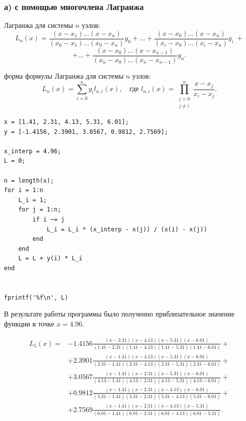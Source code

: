 \subsubsection*{а) с помощью многочлена Лагранжа}

 Лагранжа для системы $n$ узлов:
\[
L_n(x)=\frac{(x- x_1) \dots (x- x_n)}{(x_0 - x_1) \dots (x_0 - x_n)} y_0+ \dots + \frac{(x- x_0) \dots (x- x_n)}{(x_i - x_0) \dots (x_i - x_n)} y_i~+
\]
\[
+ \dots + \frac{(x- x_0) \dots (x- x_{n-1})}{(x_n - x_0) \dots (x_n - x_{n-1})} y_n.
\]

 форма формулы Лагранжа для системы $n$ узлов:
\[
L_n(x)= \sum_{i=0}^{n} y_i l_{n,i}(x), \quad \text{где } l_{n,i}(x)= \prod_{\substack{j=0 \\ j \neq i}}^{n} \frac{x- x_j}{x_i - x_j}.
\]

\begin{listing}[H]
\caption{Вычисление интерполяционного многочлена Лагранжа в точке 4.96}
\vspace{-20pt}
\label{lst:task1_lagrange}
\begin{verbatim}
x = [1.41, 2.31, 4.13, 5.31, 6.01];
y = [-1.4156, 2.3901, 3.0567, 0.9812, 2.7569];

x_interp = 4.96;
L = 0;

n = length(x);
for i = 1:n
    L_i = 1;
    for j = 1:n;
        if i ~= j
            L_i = L_i * (x_interp - x(j)) / (x(i) - x(j))
        end
    end
    L = L + y(i) * L_i
end


fprintf('%f\n', L)
\end{verbatim}
\end{listing}

В результате работы программы было полученно приблизательное значение функции в точке $x = 4.96$.

\[
\begin{aligned}
L_5(x)={}&
-1.4156\frac{(x-2.31)(x-4.13)(x-5.31)(x-6.01)}
{(1.41-2.31)(1.41-4.13)(1.41-5.31)(1.41-6.01)}+\\
&+2.3901\frac{(x-1.41)(x-4.13)(x-5.31)(x-6.01)}
{(2.31-1.41)(2.31-4.13)(2.31-5.31)(2.31-6.01)}+\\
&+3.0567\frac{(x-1.41)(x-2.31)(x-5.31)(x-6.01)}
{(4.13-1.41)(4.13-2.31)(4.13-5.31)(4.13-6.01)}+\\
&+0.9812\frac{(x-1.41)(x-2.31)(x-4.13)(x-6.01)}
{(5.31-1.41)(5.31-2.31)(5.31-4.13)(5.31-6.01)}+\\
&+2.7569\frac{(x-1.41)(x-2.31)(x-4.13)(x-5.31)}
{(6.01-1.41)(6.01-2.31)(6.01-4.13)(6.01-5.31)}.
\end{aligned}
\]


